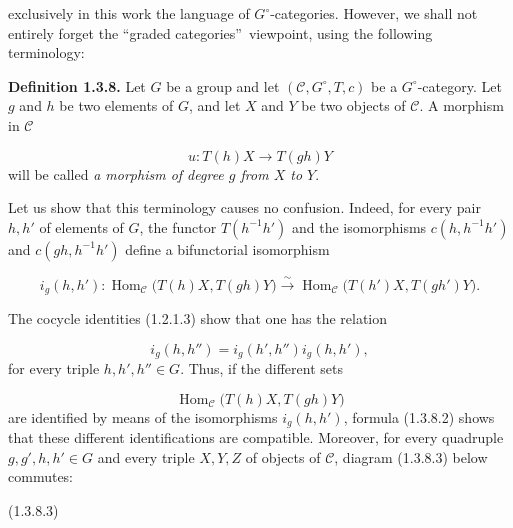 %
exclusively in this work the language of $G^\circ$-categories. However,
we shall not entirely forget the \textquotedblleft graded
categories\textquotedblright\ viewpoint, using the following
terminology:

\noindent\textbf{Definition 1.3.8.}\quad
Let $G$ be a group and let $(\mathcal C,G^\circ,T,c)$ be a
$G^\circ$-category. Let $g$ and $h$ be two elements of $G$, and let
$X$ and $Y$ be two objects of $\mathcal C$. A morphism in $\mathcal C$

\[
  u\colon T(h)X\longrightarrow T(gh)Y
\]
will be called \emph{a morphism of degree $g$ from $X$ to $Y$}.

Let us show that this terminology causes no confusion. Indeed, for
every pair $h,h'$ of elements of $G$, the functor $T(h^{-1}h')$ and
the isomorphisms $c(h,h^{-1}h')$ and $c(gh,h^{-1}h')$ define a
bifunctorial isomorphism

\begin{equation}
  i_g(h,h')\colon
  \operatorname{Hom}_{\mathcal C}\bigl(T(h)X,T(gh)Y\bigr)
  \overset{\sim}{\longrightarrow}
  \operatorname{Hom}_{\mathcal C}\bigl(T(h')X,T(gh')Y\bigr).
  \tag{1.3.8.1}
\end{equation}

The cocycle identities (1.2.1.3) show that one has the relation

\begin{equation}
  i_g(h,h'')=i_g(h',h'')i_g(h,h'),
  \tag{1.3.8.2}
\end{equation}
for every triple $h,h',h''\in G$. Thus, if the different sets

\[
  \operatorname{Hom}_{\mathcal C}\bigl(T(h)X,T(gh)Y\bigr)
\]
are identified by means of the isomorphisms $i_g(h,h')$, formula
(1.3.8.2) shows that these different identifications are compatible.
Moreover, for every quadruple $g,g',h,h'\in G$ and every triple
$X,Y,Z$ of objects of $\mathcal C$, diagram (1.3.8.3) below commutes:

\begin{center}
  \hfill\textup{(1.3.8.3)}
\end{center}

